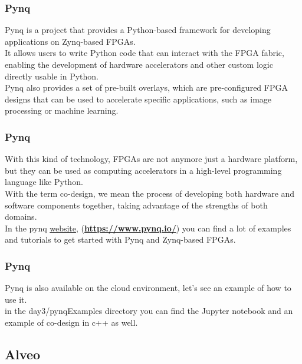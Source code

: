 \documentclass{beamer}
\begin{document}
\begin{frame}\frametitle{Pynq}
Pynq is a project that provides a Python-based framework
for developing applications on Zynq-based FPGAs. \\
\vspace{0.5cm}
It allows users to write Python code that can interact 
with the FPGA fabric, enabling the development of 
hardware accelerators and other custom logic directly
usable in Python. \\
\vspace{0.5cm}
Pynq also provides a set of pre-built overlays,
which are pre-configured FPGA designs that can be used
to accelerate specific applications, such as image
processing or machine learning. \\
\end{frame}

\begin{frame}\frametitle{Pynq}

With this kind of technology, FPGAs are not anymore 
just a hardware platform, but they can be used as
computing accelerators in a high-level programming
language like Python. \\
\vspace{0.7cm}
With the term co-design, we mean the process of
developing both hardware and software components
together, taking advantage of the strengths of both
domains. \\
\vspace{0.7cm}
In the pynq \href{https://www.pynq.io/}{website},
(\href{https://www.pynq.io/}
{\textbf{https://www.pynq.io/}})
you can find a lot of examples
and tutorials to get started with Pynq and Zynq-based
FPGAs. 
\end{frame}

\begin{frame}\frametitle{Pynq}
Pynq is also available on the cloud environment,
let's see an example of how to use it. \\
\vspace{1cm}
in the day3/pynqExamples directory you can find
the Jupyter notebook and an example of co-design
in c++ as well.
\end{frame}

\subsection{Alveo}
\end{document}

